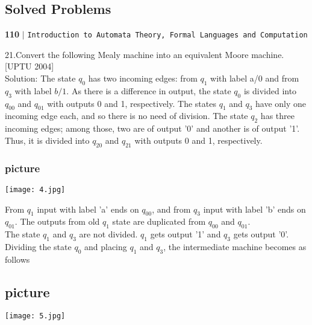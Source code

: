\documentclass[9pt]{beamer}
\begin{document}
\begin{frame}
\section*{Solved Problems}
\begin{flushleft}
    \textbf{110}\hspace*{0.1cm} \textbf{$|$} \hspace*{0.1cm} \texttt{Introduction to Automata Theory, Formal Languages and Computation}
  \end{flushleft}
  
  \vspace*{0.5cm}
  \small{
\begin{multicols}{2}
21.Convert the following Mealy machine into an equivalent Moore machine. [UPTU 2004]\\
Solution: The state $q_0$ has two incoming edges: from $q_1$ with label a/0 and from $q_3$ with label $b/1$. As there is a difference in output, the state $q_0$ is divided into $q_00$ and $q_01$ with outputs 0 and 1, respectively. The states $q_1$ and $q_3$ have only one incoming edge each, and so there is no need of division. The state $q_2$ has three incoming edges; among those, two are of output '0' and another is of output '1'. Thus, it is divided into $q_20$ and $q_21$ with outputs 0 and 1, respectively.

\begin{center}
\section{picture}
\texttt{[image: 4.jpg]}
\end{center}
\end{multicols}
}
\end{frame}

\begin{frame}
From $q_1$ input with label 'a' ends on $q_00$, and from $q_3$ input with label 'b' ends on $q_01$. The outputs from old $q_1$ state are duplicated from $q_00$ and $q_01$.\\
The state $q_1$ and $q_3$ are not divided. $q_1$ gets output '1' and $q_3$ gets output '0'.
Dividing the state $q_0$ and placing $q_1$ and $q_3$, the intermediate machine becomes as follows\\
\begin{center}
\section{picture}
\texttt{[image: 5.jpg]}
\end{center}
\end{frame}
\end{document}
